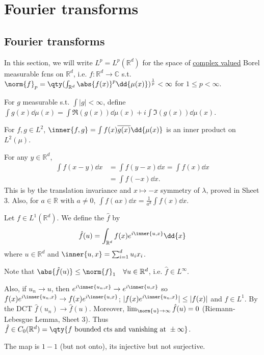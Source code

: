 \section{Fourier transforms}
\subsection{Fourier transforms}
In this section, we will write $L^p = L^p(\mathbb R^d)$ for the space of \underline{complex valued} Borel measurable fcns on $\mathbb{R}^d$, i.e. $f \colon \mathbb R^d \to \mathbb C$ s.t. $\norm{f}_p = \qty(\int_{\mathbb R^d} \abs{f(x)}^p \dd{\mu(x)})^{\frac 1p} < \infty$ for $1 \leq p < \infty$.

\begin{remark}
	For $g$ measurable s.t. $\int |g| < \infty$, define $\int g(x) \dd{\mu(x)} = \int \Re(g(x)) \dd{\mu(x)} + i \int \Im(g(x)) \dd{\mu(x)}$.

\end{remark}

For $f, g \in L^2$, $\inner{f, g} = \int f(x) \overline{g(x)} \dd{\mu(x)}$ is an inner product on $L^2(\mu)$.

For any $y \in \mathbb{R}^d$,
\begin{align*}
	\int f(x - y) \dd{x} &= \int f(y - x) \dd{x} = \int f(x) \dd{x} \\
	&= \int f(-x) \dd{x}.
\end{align*}
This is by the translation invariance and $x \mapsto -x$ symmetry of $\lambda$, proved in Sheet 3.
Also, for $a \in \mathbb{R}$ with $a \neq 0$, $\int f(ax) \dd{x} = \frac{1}{a^d} \int f(x) \dd{x}$.

\begin{definition}
	Let $f \in L^1(\mathbb R^d)$.
	We define the  $\hat f$ by
	\[ \hat f(u) = \int_{\mathbb R^d} f(x) e^{i\inner{u,x}} \dd{x} \]
	where $u \in \mathbb{R}^d$ and $\inner{u,x} = \sum_{i=1}^d u_i x_i$.
\end{definition}

\begin{remark}
	Note that $\abs{\hat f(u)} \leq \norm{f}_1 \quad \forall u \in \mathbb{R}^d$, i.e. $\hat{f} \in L^\infty$.

	Also, if $u_n \to u$, then $e^{i\inner{u_n,x}} \to e^{i\inner{u,x}}$ so $f(x) e^{i\inner{u_n,x}} \to f(x) e^{i\inner{u,x}}$; $|f(x) e^{i\inner{u_n,x}}| \leq |f(x)|$ and $f \in L^1$.
	By the DCT $\hat f(u_n) \to \hat f(u)$.
	Moreover, $\lim_{\norm{u} \to \infty} \hat{f}(u) = 0$ (Riemann-Lebesgue Lemma, Sheet 3).
	Thus $\hat f \in C_0(\mathbb{R}^d) = \qty{f \text{ bounded cts and vanishing at } \pm \infty}$.

	The map is $1 - 1$ (but not onto), its injective but not surjective.
\end{remark}

